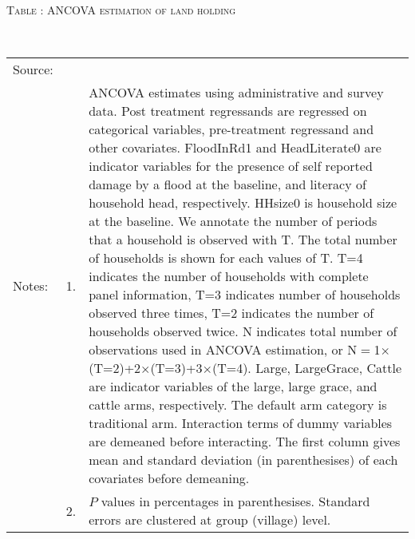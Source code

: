 \hspace{-1cm}\begin{minipage}[t]{14cm}
\hfil\textsc{\normalsize Table \thetable: ANCOVA estimation of land holding\label{tab ANCOVA land}}\\
\setlength{\tabcolsep}{1pt}
\setlength{\baselineskip}{8pt}
\renewcommand{\arraystretch}{.55}
\hfil{}\\
\renewcommand{\arraystretch}{.8}
\setlength{\tabcolsep}{1pt}
\begin{tabular}{>{\hfill\scriptsize}p{1cm}<{}>{\hfill\scriptsize}p{.25cm}<{}>{\scriptsize}p{12cm}<{\hfill}}
Source:& \multicolumn{2}{l}{\scriptsize Estimated with GUK administrative and survey data.}\\
Notes: & 1. & ANCOVA estimates using administrative and survey data. Post treatment regressands are regressed on categorical variables, pre-treatment regressand and other covariates. \textsf{FloodInRd1} and \textsf{HeadLiterate0} are indicator variables for the presence of self reported damage by a flood at the baseline, and literacy of household head, respectively. \textsf{HHsize0} is household size at the baseline. We annotate the number of periods that a household is observed with \textsf{T}. The total number of households is shown for each values of \textsf{T}. \textsf{T=4} indicates the number of households with complete panel information, \textsf{T=3} indicates number of households observed three times, \textsf{T=2} indicates the number of households observed twice. \textsf{N} indicates total number of observations used in ANCOVA estimation, or \textsf{N$=$1$\times$(T=2)+2$\times$(T=3)+3$\times$(T=4)}.  \textsf{Large}, \textsf{LargeGrace}, \textsf{Cattle} are indicator variables of the \textsf{large}, \textsf{large grace}, and \textsf{cattle} arms, respectively. The default arm category is \textsf{traditional} arm. Interaction terms of dummy variables are demeaned before interacting. The first column gives mean and standard deviation (in parenthesises) of each covariates before demeaning.\\
& 2. & $P$ values in percentages in parenthesises. Standard errors are clustered at group (village) level.
\end{tabular}
\end{minipage}

